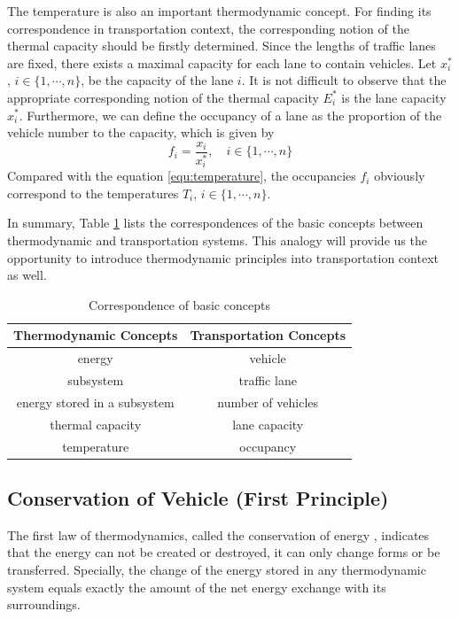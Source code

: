 \documentclass[preprint,authoryear,12pt]{elsarticle}
\begin{document}
The temperature is also an important thermodynamic concept. For
finding its correspondence in transportation context, the
corresponding notion of the thermal capacity should be firstly
determined. Since the lengths of traffic lanes are fixed, there
exists a maximal capacity for each lane to contain vehicles. Let
$x_i^*$, $i\in\{1,\cdots,n\}$, be the capacity of the lane $i$. It is
not difficult to observe that the appropriate corresponding notion of
the thermal capacity $E_i^*$ is the lane capacity $x_i^*$.
Furthermore, we can define the occupancy of a lane as the proportion
of the vehicle number to the capacity, which is given by
\begin{equation}\label{equ:occupancy}
f_i = \frac{x_i}{x_i^*},\quad i\in\{1,\cdots,n\}
\end{equation}
Compared with the equation \eqref{equ:temperature}, the occupancies
$f_i$ obviously correspond to the temperatures $T_i$,
$i\in\{1,\cdots,n\}$.

In summary, Table \ref{tab:notions} lists the correspondences of the
basic concepts between thermodynamic and transportation systems. This
analogy will provide us the opportunity to introduce thermodynamic
principles into transportation context as well.

\begin{table}[ht]
\centering \caption{Correspondence of basic concepts}
\label{tab:notions}
\begin{tabular}{cc}
  \hline
  Thermodynamic Concepts & Transportation Concepts \\
  \hline
  energy & vehicle \\
  subsystem & traffic lane \\
  energy stored in a subsystem & number of vehicles \\
  thermal capacity & lane capacity \\
  temperature & occupancy \\
  \hline
\end{tabular}
\end{table}

\subsection{Conservation of Vehicle (First Principle)}

The first law of thermodynamics, called the conservation of energy
\citep{cengel_thermodynamics:_2001}, indicates that the energy can
not be created or destroyed, it can only change forms or be
transferred. Specially, the change of the energy stored in any
thermodynamic system equals exactly the amount of the net energy
exchange with its surroundings.
\end{document}

